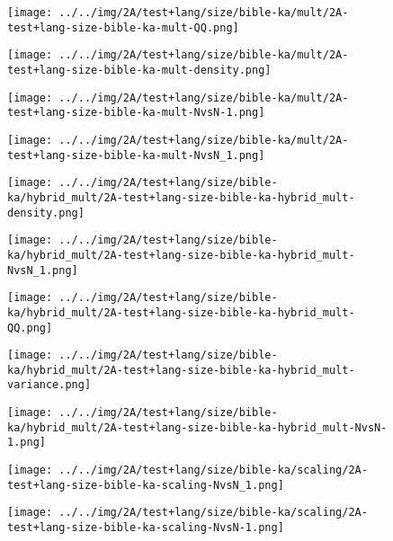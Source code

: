 \begin{figure}[H]
\centering	\texttt{[image: ../../img/2A/test+lang/size/bible-ka/mult/2A-test+lang-size-bible-ka-mult-QQ.png]}
\end{figure}
\begin{figure}[H]
\centering	\texttt{[image: ../../img/2A/test+lang/size/bible-ka/mult/2A-test+lang-size-bible-ka-mult-density.png]}
\end{figure}
\begin{figure}[H]
\centering	\texttt{[image: ../../img/2A/test+lang/size/bible-ka/mult/2A-test+lang-size-bible-ka-mult-NvsN-1.png]}
\end{figure}
\begin{figure}[H]
\centering	\texttt{[image: ../../img/2A/test+lang/size/bible-ka/mult/2A-test+lang-size-bible-ka-mult-NvsN\_1.png]}
\end{figure}
\begin{figure}[H]
\centering	\texttt{[image: ../../img/2A/test+lang/size/bible-ka/hybrid\_mult/2A-test+lang-size-bible-ka-hybrid\_mult-density.png]}
\end{figure}
\begin{figure}[H]
\centering	\texttt{[image: ../../img/2A/test+lang/size/bible-ka/hybrid\_mult/2A-test+lang-size-bible-ka-hybrid\_mult-NvsN\_1.png]}
\end{figure}
\begin{figure}[H]
\centering	\texttt{[image: ../../img/2A/test+lang/size/bible-ka/hybrid\_mult/2A-test+lang-size-bible-ka-hybrid\_mult-QQ.png]}
\end{figure}
\begin{figure}[H]
\centering	\texttt{[image: ../../img/2A/test+lang/size/bible-ka/hybrid\_mult/2A-test+lang-size-bible-ka-hybrid\_mult-variance.png]}
\end{figure}
\begin{figure}[H]
\centering	\texttt{[image: ../../img/2A/test+lang/size/bible-ka/hybrid\_mult/2A-test+lang-size-bible-ka-hybrid\_mult-NvsN-1.png]}
\end{figure}
\begin{figure}[H]
\centering	\texttt{[image: ../../img/2A/test+lang/size/bible-ka/scaling/2A-test+lang-size-bible-ka-scaling-NvsN\_1.png]}
\end{figure}
\begin{figure}[H]
\centering	\texttt{[image: ../../img/2A/test+lang/size/bible-ka/scaling/2A-test+lang-size-bible-ka-scaling-NvsN-1.png]}
\end{figure}
